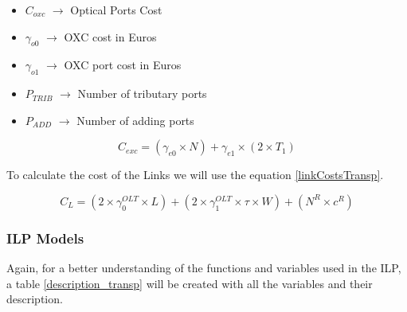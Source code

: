 \begin{itemize}
\item{$C_{oxc}$		$\rightarrow$	Optical Ports Cost}
\item{$\gamma_{o0}$	$\rightarrow$	OXC cost in Euros}
\item{$\gamma_{o1}$	$\rightarrow$	OXC port cost in Euros}
\item{$P_{TRIB}	$	$\rightarrow$	Number of tributary ports}
\item{$P_{ADD} $	$\rightarrow$	Number of adding ports}
\end{itemize}

\begin{equation}
C_{exc} = \left(\gamma_{e0}\times N\right) + \gamma_{e1} \times \left(2 \times T_1 \right)		\label{electricalCostTransp}
\end{equation}

\vspace{10pt}

To calculate the cost of the Links we will use the equation \ref{linkCostsTransp}.

\begin{equation}
C_L = \left(2 \times \gamma_0^{OLT} \times L\right) + \left(2 \times \gamma_1^{OLT} \times \tau \times W\right) + \left(N^R \times c^R\right)
\label{linkCostsTransp}
\end{equation}



\subsubsection{ILP Models} \label{ILP_models_Transp}

Again, for a better understanding of the functions and variables used in the ILP, a table \ref{description_transp} will be created with all the variables and their description.

